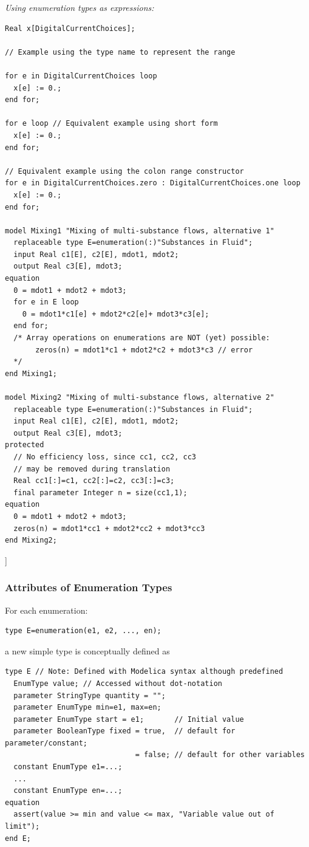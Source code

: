 \documentclass[10pt,a4paper]{report}
\def\doublelabel#1{\label{#1}}
\begin{document}
\emph{Using enumeration types as expressions:}
\begin{lstlisting}[language=Modelica]
Real x[DigitalCurrentChoices];

// Example using the type name to represent the range

for e in DigitalCurrentChoices loop
  x[e] := 0.;
end for;

for e loop // Equivalent example using short form
  x[e] := 0.;
end for;

// Equivalent example using the colon range constructor
for e in DigitalCurrentChoices.zero : DigitalCurrentChoices.one loop
  x[e] := 0.;
end for;

model Mixing1 "Mixing of multi-substance flows, alternative 1"
  replaceable type E=enumeration(:)"Substances in Fluid";
  input Real c1[E], c2[E], mdot1, mdot2;
  output Real c3[E], mdot3;
equation
  0 = mdot1 + mdot2 + mdot3;
  for e in E loop
    0 = mdot1*c1[e] + mdot2*c2[e]+ mdot3*c3[e];
  end for;
  /* Array operations on enumerations are NOT (yet) possible:
       zeros(n) = mdot1*c1 + mdot2*c2 + mdot3*c3 // error
  */
end Mixing1;

model Mixing2 "Mixing of multi-substance flows, alternative 2"
  replaceable type E=enumeration(:)"Substances in Fluid";
  input Real c1[E], c2[E], mdot1, mdot2;
  output Real c3[E], mdot3;
protected
  // No efficiency loss, since cc1, cc2, cc3
  // may be removed during translation
  Real cc1[:]=c1, cc2[:]=c2, cc3[:]=c3;
  final parameter Integer n = size(cc1,1);
equation
  0 = mdot1 + mdot2 + mdot3;
  zeros(n) = mdot1*cc1 + mdot2*cc2 + mdot3*cc3
end Mixing2;
\end{lstlisting}

{]}

\subsubsection{Attributes of Enumeration Types}\doublelabel{attributes-of-enumeration-types}

For each enumeration:
\begin{lstlisting}[language=Modelica]
type E=enumeration(e1, e2, ..., en);
\end{lstlisting}

a new simple type is conceptually defined as

\begin{lstlisting}[language=Modelica]
type E // Note: Defined with Modelica syntax although predefined
  EnumType value; // Accessed without dot-notation
  parameter StringType quantity = "";
  parameter EnumType min=e1, max=en;
  parameter EnumType start = e1;       // Initial value
  parameter BooleanType fixed = true,  // default for parameter/constant;
                              = false; // default for other variables
  constant EnumType e1=...;
  ...
  constant EnumType en=...;
equation
  assert(value >= min and value <= max, "Variable value out of limit");
end E;
\end{lstlisting}
\end{document}
